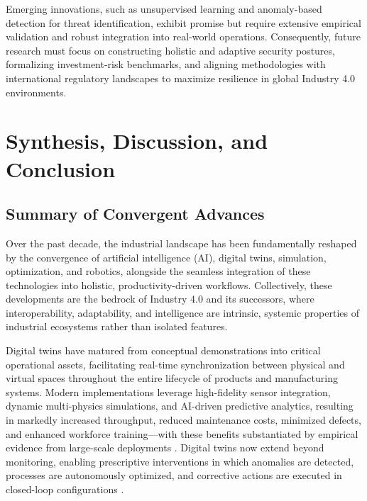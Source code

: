 \documentclass[sigconf]{acmart}
\begin{document}
Emerging innovations, such as unsupervised learning and anomaly-based detection for threat identification, exhibit promise but require extensive empirical validation and robust integration into real-world operations. Consequently, future research must focus on constructing holistic and adaptive security postures, formalizing investment-risk benchmarks, and aligning methodologies with international regulatory landscapes to maximize resilience in global Industry 4.0 environments.

\section{Synthesis, Discussion, and Conclusion}

\subsection{Summary of Convergent Advances}

Over the past decade, the industrial landscape has been fundamentally reshaped by the convergence of artificial intelligence (AI), digital twins, simulation, optimization, and robotics, alongside the seamless integration of these technologies into holistic, productivity-driven workflows. Collectively, these developments are the bedrock of Industry 4.0 and its successors, where interoperability, adaptability, and intelligence are intrinsic, systemic properties of industrial ecosystems rather than isolated features.

Digital twins have matured from conceptual demonstrations into critical operational assets, facilitating real-time synchronization between physical and virtual spaces throughout the entire lifecycle of products and manufacturing systems. Modern implementations leverage high-fidelity sensor integration, dynamic multi-physics simulations, and AI-driven predictive analytics, resulting in markedly increased throughput, reduced maintenance costs, minimized defects, and enhanced workforce training—with these benefits substantiated by empirical evidence from large-scale deployments \cite{ref38}. Digital twins now extend beyond monitoring, enabling prescriptive interventions in which anomalies are detected, processes are autonomously optimized, and corrective actions are executed in closed-loop configurations \cite{ref41}\cite{ref43}.
\end{document}

